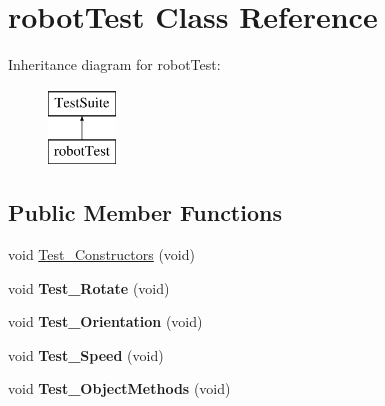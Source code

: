 \hypertarget{classrobotTest}{\section{robot\-Test Class Reference}
\label{classrobotTest}
}
Inheritance diagram for robot\-Test\-:\begin{figure}[H]
\begin{center}
\leavevmode
\includegraphics[height=2.000000cm]{classrobotTest}
\end{center}
\end{figure}
\subsection*{Public Member Functions}
\begin{DoxyCompactItemize}
\item 
void \hyperlink{classrobotTest_ad2033bb1340f83b08ab0213e962e6cd1}{Test\-\_\-\-Constructors} (void)
\item 
\hypertarget{classrobotTest_af5f647080eca8803f6b696d3d15eac5e}{void {\bfseries Test\-\_\-\-Rotate} (void)}\label{classrobotTest_af5f647080eca8803f6b696d3d15eac5e}

\item 
\hypertarget{classrobotTest_ac76035a9acec40905daf1145e15f03a8}{void {\bfseries Test\-\_\-\-Orientation} (void)}\label{classrobotTest_ac76035a9acec40905daf1145e15f03a8}

\item 
\hypertarget{classrobotTest_a3c4244aba00b65e8bf9e341ca99a9f90}{void {\bfseries Test\-\_\-\-Speed} (void)}\label{classrobotTest_a3c4244aba00b65e8bf9e341ca99a9f90}

\item 
\hypertarget{classrobotTest_a70ff6f11715d6c49621195d2d7033982}{void {\bfseries Test\-\_\-\-Object\-Methods} (void)}\label{classrobotTest_a70ff6f11715d6c49621195d2d7033982}

\end{DoxyCompactItemize}


